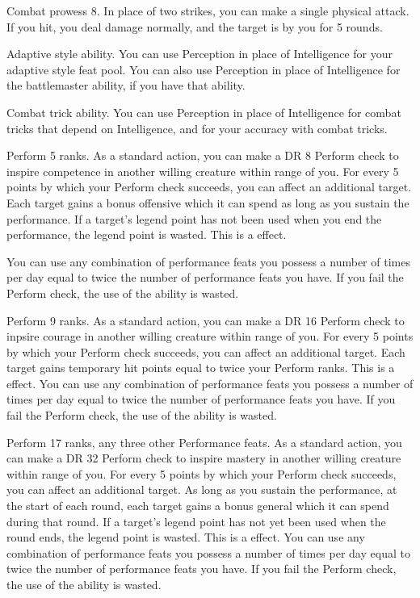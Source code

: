 \featpre Combat prowess 8.
\featben In place of two strikes, you can make a single physical attack.
If you hit, you deal damage normally, and the target is \taunted by you for 5 rounds.

\featpre Adaptive style ability.
\featben You can use Perception in place of Intelligence for your adaptive style feat pool.
You can also use Perception in place of Intelligence for the battlemaster ability, if you have that ability.

\featpre Combat trick ability.
\featben You can use Perception in place of Intelligence for combat tricks that depend on Intelligence, and for your accuracy with combat tricks.

\featpre Perform 5 ranks.
\featben As a standard action, you can make a DR 8 Perform check to inspire competence in another willing creature within \rngmed range of you.
For every 5 points by which your Perform check succeeds, you can affect an additional target.
Each target gains a bonus offensive  which it can spend as long as you sustain the performance.
If a target's legend point has not been used when you end the performance, the legend point is wasted.
This is a  effect.

 You can use any combination of performance feats you possess a number of times per day equal to twice the number of performance feats you have.
If you fail the Perform check, the use of the ability is wasted.

\featpre Perform 9 ranks.
\featben As a standard action, you can make a DR 16 Perform check to inpsire courage in another willing creature within \rngmed range of you.
For every 5 points by which your Perform check succeeds, you can affect an additional target.
Each target gains temporary hit points equal to twice your Perform ranks.
This is a  effect.
 You can use any combination of performance feats you possess a number of times per day equal to twice the number of performance feats you have.
If you fail the Perform check, the use of the ability is wasted.

\featpres Perform 17 ranks, any three other Performance feats.
\featben As a standard action, you can make a DR 32 Perform check to inspire mastery in another willing creature within \rngmed range of you.
For every 5 points by which your Perform check succeeds, you can affect an additional target.
As long as you sustain the performance, at the start of each round, each target gains a bonus general  which it can spend during that round.
If a target's legend point has not yet been used when the round ends, the legend point is wasted.
This is a  effect.
 You can use any combination of performance feats you possess a number of times per day equal to twice the number of performance feats you have.
If you fail the Perform check, the use of the ability is wasted.

